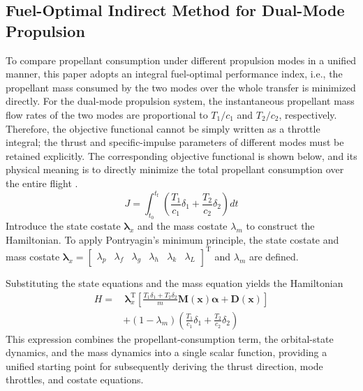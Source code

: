 ﻿\documentclass{IEEEtaes}
\begin{document}
\subsection{Fuel-Optimal Indirect Method for Dual-Mode Propulsion}
To compare propellant consumption under different propulsion modes in a unified manner, this paper adopts an integral fuel-optimal performance index, i.e., the propellant mass consumed by the two modes over the whole transfer is minimized directly. For the dual-mode propulsion system, the instantaneous propellant mass flow rates of the two modes are proportional to $T_1/c_1$ and $T_2/c_2$, respectively. Therefore, the objective functional cannot be simply written as a throttle integral; the thrust and specific-impulse parameters of different modes must be retained explicitly. The corresponding objective functional is shown below, and its physical meaning is to directly minimize the total propellant consumption over the entire flight \cite{cline2024a}.
\begin{equation}
J=\int_{t_0}^{t_{\mathrm{f}}}\left(\frac{T_1}{c_1}\delta_1+\frac{T_2}{c_2}\delta_2\right)dt
\end{equation}
Introduce the state costate $\bm{\lambda}_x$ and the mass costate $\lambda_m$ to construct the Hamiltonian. To apply Pontryagin's minimum principle, the state costate and mass costate $\bm{\lambda}_x=\begin{bmatrix}\lambda_p&\lambda_f&\lambda_g&\lambda_h&\lambda_k&\lambda_L\end{bmatrix}^{\mathrm{T}}$ and $\lambda_m$ are defined.

Substituting the state equations and the mass equation yields the Hamiltonian
\begin{equation}
\begin{aligned}
H=&\,\bm{\lambda}_x^{\mathrm{T}}\left[\frac{T_1\delta_1+T_2\delta_2}{m}\bm{M}(\bm{x})\bm{\alpha}+\bm{D}(\bm{x})\right]\\
&+(1-\lambda_m)\left(\frac{T_1}{c_1}\delta_1+\frac{T_2}{c_2}\delta_2\right)
\end{aligned}
\end{equation}
This expression combines the propellant-consumption term, the orbital-state dynamics, and the mass dynamics into a single scalar function, providing a unified starting point for subsequently deriving the thrust direction, mode throttles, and costate equations.
\end{document}
